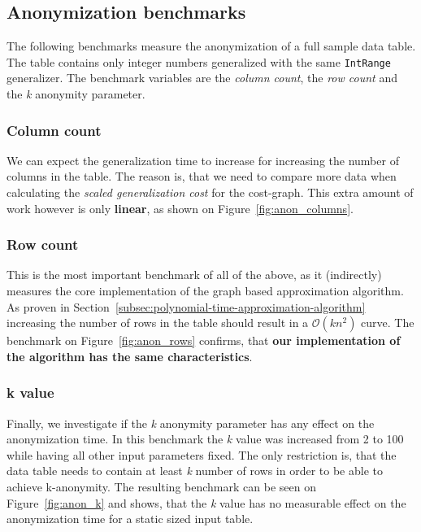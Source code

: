 \vspace{\baselineskip}


\vspace{\baselineskip}


\subsection{Anonymization benchmarks}

The following benchmarks measure the anonymization of a full sample data table. The table contains only integer numbers generalized with the same \texttt{IntRange} generalizer. The benchmark variables are the \emph{column count}, the \emph{row count} and the \emph{k} anonymity parameter.

\subsubsection{Column count}

We can expect the generalization time to increase for increasing the number of columns in the table. The reason is, that we need to compare more data when calculating the \emph{scaled generalization cost} for the cost-graph. This extra amount of work however is only \textbf{linear}, as shown on Figure~\ref{fig:anon_columns}.

\vspace{\baselineskip}


\subsubsection{Row count}

This is the most important benchmark of all of the above, as it (indirectly) measures the core implementation of the graph based approximation algorithm. As proven in Section~\ref{subsec:polynomial-time-approximation-algorithm} increasing the number of rows in the table should result in a \(\mathcal{O}(kn^2)\) curve. The benchmark on Figure~\ref{fig:anon_rows} confirms, that \textbf{our implementation of the algorithm has the same characteristics}.

\vspace{\baselineskip}


\subsubsection{k value}

Finally, we investigate if the \emph{k} anonymity parameter has any effect on the anonymization time. In this benchmark the \emph{k} value was increased from 2 to 100 while having all other input parameters fixed. The only restriction is, that the data table needs to contain at least \emph{k} number of rows in order to be able to achieve k-anonymity. The resulting benchmark can be seen on Figure~\ref{fig:anon_k} and shows, that the \emph{k} value has no measurable effect on the anonymization time for a static sized input table.

\vspace{\baselineskip}
